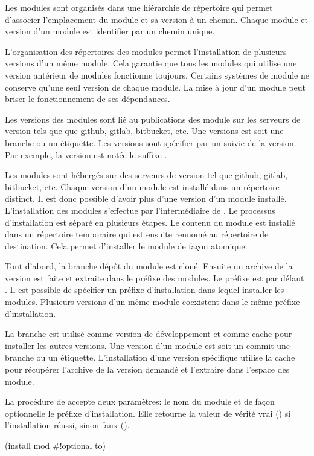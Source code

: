 Les modules sont organisés dans une hiérarchie de répertoire qui permet
d'associer l'emplacement du module et sa version à un chemin.
Chaque module et version d'un module est identifier par un chemin unique.

L'organisation des répertoires des modules permet l'installation de plusieurs
versions d'un même module. Cela garantie que tous les modules qui utilise une
version antérieur de modules fonctionne toujours. Certains systèmes de module
ne conserve qu'une seul version de chaque module. La mise à jour d'un module
peut briser le fonctionnement de ses dépendances.

Les versions des modules sont lié au publications des module sur les serveurs
de version tels que que github, gitlab, bitbucket, etc. Une versions est soit
une branche ou un étiquette. Les versions sont spécifier par un 
suivie de la version. Par exemple, la version  est notée le
suffixe .



Les modules sont hébergés sur des serveurs de version tel que github, gitlab,
bitbucket, etc. Chaque version d'un module est installé dans un répertoire
distinct. Il est donc possible d'avoir plus d'une version d'un module installé.
L'installation des modules s'effectue par l'intermédiaire de
. Le processus d'installation est séparé en plusieurs étapes.  Le
contenu du module est installé dans un répertoire temporaire qui est ensuite
rennomé au répertoire de destination. Cela permet d'installer le module de
façon atomique.

Tout d'abord, la
branche  dépôt du module est cloné. Ensuite un archive de la
version est faite et extraite dans le préfixe des modules. Le préfixe est par
défaut .  Il est possible de spécifier un préfixe
d'installation dans lequel installer les modules. Plusieurs versions d'un même
module coexistent dans le même préfixe d'installation.

La branche  est utilisé comme version de développement et
comme cache pour installer les autres versions. Une version d'un module est soit
un commit une branche ou un étiquette. L'installation d'une version
spécifique utilise la cache pour récupérer l'archive de la version demandé
et l'extraire dans l'espace des module.

La procédure  de  accepte deux paramètres:
le nom du module et de façon optionnelle le préfixe d'installation. Elle
retourne la valeur de vérité vrai () si l'installation réussi,
sinon faux ().
\begin{center}
  \begin{mplisting}{0.4}
(install mod #!optional to)
\end{mplisting}
\end{center}

